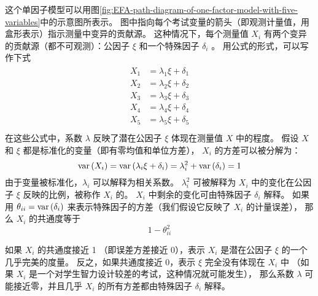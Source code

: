 这个单因子模型可以用图\ref{fig:EFA-path-diagram-of-one-factor-model-with-five-variables}中的示意图所表示。
图中指向每个考试变量的箭头（即观测计量值，用盒形表示）指示测量中变异的贡献源。
这种情况下，每个测量值 $ X_i $ 有两个变异的贡献源（都不可观测）：公因子 $ \xi $ 和一个特殊因子 $ \delta_i $ 。
用公式的形式，可以写作下式
\begin{align}
    \begin{split}
        X_1 & = \lambda_1\xi + \delta_1 \\ 
        X_2 & = \lambda_2\xi + \delta_2 \\ 
        X_3 & = \lambda_3\xi + \delta_3 \\ 
        X_4 & = \lambda_4\xi + \delta_4 \\ 
        X_5 & = \lambda_5\xi + \delta_5 \\ 
    \end{split}
\end{align}
在这些公式中，系数 $ \lambda $ 反映了潜在公因子 $ \xi $ 体现在测量值 $ X $ 中的程度。
假设 $ X $ 和 $ \xi $ 都是标准化的变量（即有零均值和单位方差）， $ X_i $ 的方差可以被分解为：
\begin{equation}
    \mathrm{var}\left({X_i}\right) = \mathrm{var}\left({\lambda_i\xi + \delta_i}\right) = \lambda_i^2 + \mathrm{var}\left({\delta_i}\right) = 1
\end{equation}
由于变量被标准化，$ \lambda_i $ 可以解释为相关系数。
$ \lambda_i^2 $ 可被解释为 $ X_i $ 中的变化在公因子 $ \xi $ 反映的比例，被称作 $ X_i $ 的。
$ X_i $ 中剩余的变化可由特殊因子 $ \delta_i $ 解释。
如果用 $ \theta_{ii} = \mathrm{var}\left({\delta_i}\right) $ 来表示特殊因子的方差（我们假设它反映了 $ X_i $ 的计量误差），
那么 $ X_i $ 的共通度等于
\begin{equation}
    1 - \theta_{ii}^2
\end{equation}

如果 $ X_i $ 的共通度接近 1 （即误差方差接近 0），表示 $ X_i $ 是潜在公因子 $ \xi $ 的一个几乎完美的度量。
反之，如果共通度接近 0，表示 $ \xi $ 完全没有体现在 $ X_i $ 中
（如果 $ X_i $ 是一个对学生智力设计较差的考试，这种情况就可能发生），
那么系数 $ \lambda $ 可能接近零，并且几乎 $ X_i $ 的所有方差都由特殊因子 $ \delta_i $ 解释。

